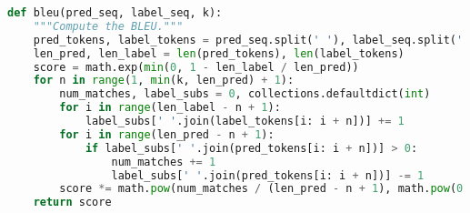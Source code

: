\begin{lstlisting}[language=Python, caption=BLEU - Python]
def bleu(pred_seq, label_seq, k):
    """Compute the BLEU."""
    pred_tokens, label_tokens = pred_seq.split(' '), label_seq.split(' ')
    len_pred, len_label = len(pred_tokens), len(label_tokens)
    score = math.exp(min(0, 1 - len_label / len_pred))
    for n in range(1, min(k, len_pred) + 1):
        num_matches, label_subs = 0, collections.defaultdict(int)
        for i in range(len_label - n + 1):
            label_subs[' '.join(label_tokens[i: i + n])] += 1
        for i in range(len_pred - n + 1):
            if label_subs[' '.join(pred_tokens[i: i + n])] > 0:
                num_matches += 1
                label_subs[' '.join(pred_tokens[i: i + n])] -= 1
        score *= math.pow(num_matches / (len_pred - n + 1), math.pow(0.5, n))
    return score
\end{lstlisting}






















